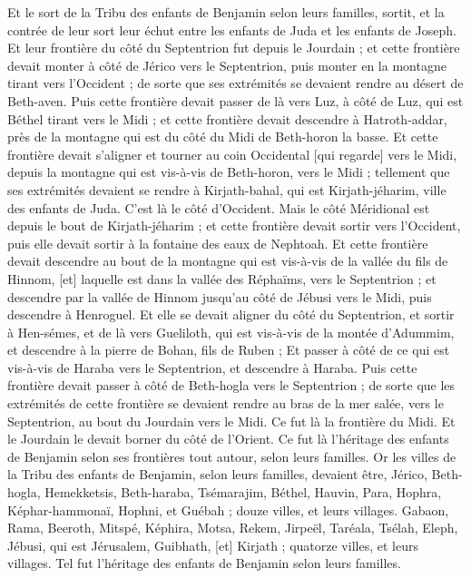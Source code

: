 \begin{multicols}{2}
Et le sort de la Tribu des enfants de Benjamin selon leurs familles, sortit, et la contrée de leur sort leur échut entre les enfants de Juda et les enfants de Joseph.
Et leur frontière du côté du Septentrion fut depuis le Jourdain ; et cette frontière devait monter à côté de Jérico vers le Septentrion, puis monter en la montagne tirant vers l'Occident ; de sorte que ses extrémités se devaient rendre au désert de Beth-aven.
Puis cette frontière devait passer de là vers Luz, à côté de Luz, qui est Béthel tirant vers le Midi ; et cette frontière devait descendre à Hatroth-addar, près de la montagne qui est du côté du Midi de Beth-horon la basse.
Et cette frontière devait s'aligner et tourner au coin Occidental [qui regarde] vers le Midi, depuis la montagne qui est vis-à-vis de Beth-horon, vers le Midi ; tellement que ses extrémités devaient se rendre à Kirjath-bahal, qui est Kirjath-jéharim, ville des enfants de Juda. C'est là le côté d'Occident.
Mais le côté Méridional est depuis le bout de Kirjath-jéharim ; et cette frontière devait sortir vers l'Occident, puis elle devait sortir à la fontaine des eaux de Nephtoah.
Et cette frontière devait descendre au bout de la montagne qui est vis-à-vis de la vallée du fils de Hinnom, [et] laquelle est dans la vallée des Réphaïms, vers le Septentrion ; et descendre par la vallée de Hinnom jusqu'au côté de Jébusi vers le Midi, puis descendre à Henroguel.
Et elle se devait aligner du côté du Septentrion, et sortir à Hen-sémes, et de là vers Gueliloth, qui est vis-à-vis de la montée d'Adummim, et descendre à la pierre de Bohan, fils de Ruben ;
Et passer à côté de ce qui est vis-à-vis de Haraba vers le Septentrion, et descendre à Haraba.
Puis cette frontière devait passer à côté de Beth-hogla vers le Septentrion ; de sorte que les extrémités de cette frontière se devaient rendre au bras de la mer salée, vers le Septentrion, au bout du Jourdain vers le Midi. Ce fut là la frontière du Midi.
Et le Jourdain le devait borner du côté de l'Orient. Ce fut là l'héritage des enfants de Benjamin selon ses frontières tout autour, selon leurs familles.
Or les villes de la Tribu des enfants de Benjamin, selon leurs familles, devaient être, Jérico, Beth-hogla, Hemekketsis,
Beth-haraba, Tsémarajim, Béthel,
Hauvin, Para, Hophra,
Képhar-hammonaï, Hophni, et Guébah ; douze villes, et leurs villages.
Gabaon, Rama, Beeroth,
Mitspé, Képhira, Motsa,
Rekem, Jirpeël, Taréala,
Tsélah, Eleph, Jébusi, qui est Jérusalem, Guibhath, [et] Kirjath ; quatorze villes, et leurs villages. Tel fut l'héritage des enfants de Benjamin selon leurs familles.

\end{multicols}
